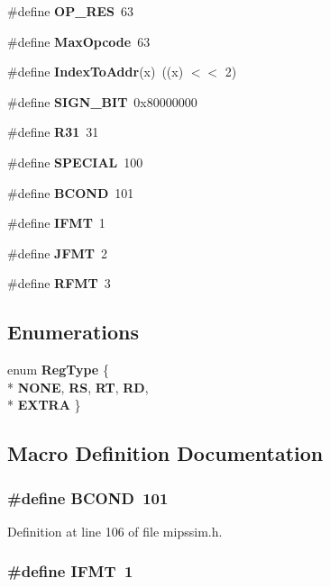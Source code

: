 \begin{DoxyCompactItemize}
\#define {\bf O\+P\+\_\+\+R\+ES}~63
\item 
\#define {\bf Max\+Opcode}~63
\item 
\#define {\bf Index\+To\+Addr}(x)~((x) $<$$<$ 2)
\item 
\#define {\bf S\+I\+G\+N\+\_\+\+B\+IT}~0x80000000
\item 
\#define {\bf R31}~31
\item 
\#define {\bf S\+P\+E\+C\+I\+AL}~100
\item 
\#define {\bf B\+C\+O\+ND}~101
\item 
\#define {\bf I\+F\+MT}~1
\item 
\#define {\bf J\+F\+MT}~2
\item 
\#define {\bf R\+F\+MT}~3
\end{DoxyCompactItemize}
\subsection*{Enumerations}
\begin{DoxyCompactItemize}
\item 
enum {\bf Reg\+Type} \{ \\*
{\bf N\+O\+NE}, 
{\bf RS}, 
{\bf RT}, 
{\bf RD}, 
\\*
{\bf E\+X\+T\+RA}
 \}
\end{DoxyCompactItemize}


\subsection{Macro Definition Documentation}
\subsubsection[{B\+C\+O\+ND}]{\setlength{\rightskip}{0pt plus 5cm}\#define B\+C\+O\+ND~101}\label{mipssim_8h_af0b52792b441e1569ec4bb77feb11db7}


Definition at line 106 of file mipssim.\+h.

\subsubsection[{I\+F\+MT}]{\setlength{\rightskip}{0pt plus 5cm}\#define I\+F\+MT~1}\label{mipssim_8h_a23e85f2f4a195620db3d32f4248726a0}


